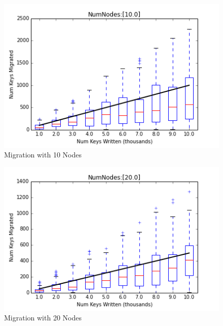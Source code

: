 \documentclass[10pt,twocolumn,letterpaper]{article}
\begin{document}
%
%
%

\begin{figure}[hbt]
 \centering
 \includegraphics[scale=0.50]{10.png}
 \caption{Migration with 10 Nodes}
\label{fig:subfigure10n}
\end{figure}

\begin{figure}[hbt]
 \centering
 \includegraphics[scale=0.50]{20.png}
 \caption{Migration with 20 Nodes}
\label{fig:subfigure20n}
\end{figure}
\end{document}
